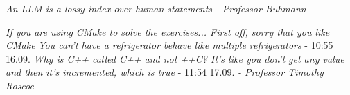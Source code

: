 \documentclass{article}
\begin{document}
\startDocument
\usetcolorboxes


\textit{An LLM is a lossy index over human statements}
\textit{- Professor Buhmann}

\textit{If you are using CMake to solve the exercises... First off, sorry that you like CMake}
\textit{You can't have a refrigerator behave like multiple refrigerators} - 10:55 16.09.
\textit{Why is C++ called C++ and not ++C? It's like you don't get any value and then it's incremented, which is true} - 11:54 17.09.
\textit{- Professor Timothy Roscoe}
\end{document}
